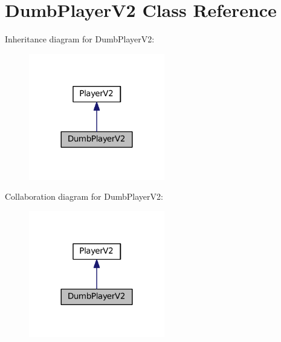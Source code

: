 \hypertarget{classDumbPlayerV2}{}\section{Dumb\+Player\+V2 Class Reference}
\label{classDumbPlayerV2}


Inheritance diagram for Dumb\+Player\+V2\+:\nopagebreak
\begin{figure}[H]
\begin{center}
\leavevmode
\includegraphics[width=168pt]{classDumbPlayerV2__inherit__graph}
\end{center}
\end{figure}


Collaboration diagram for Dumb\+Player\+V2\+:\nopagebreak
\begin{figure}[H]
\begin{center}
\leavevmode
\includegraphics[width=168pt]{classDumbPlayerV2__coll__graph}
\end{center}
\end{figure}
